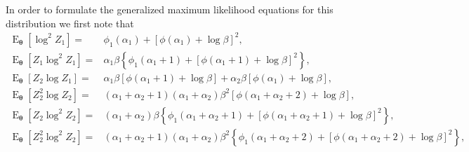 \documentclass[10pt,a4paper,onecolumn]{article} %
\newcommand{\bs}{\boldsymbol}
\newcommand{\on}{\operatorname}
\begin{document}
In order to formulate the generalized maximum likelihood equations for this distribution we first note that
\begin{equation*}
\begin{aligned}
\on{E}_{\bs{\theta}}\left[\log^2 Z_1\right] = & \phi_1(\alpha_1) + \left[\phi(\alpha_1) + \log \beta\right]^2, \\
\on{E}_{\bs{\theta}}\left[Z_1 \log^2 Z_1\right] = & \alpha_1\beta\left\{ \phi_1(\alpha_1 + 1) + \left[\phi(\alpha_1 + 1) + \log \beta\right]^2\right\}, \\
\on{E}_{\bs{\theta}}\left[Z_2 \log Z_1\right] =& \alpha_1\beta \left[\phi(\alpha_1 + 1) + \log \beta\right] + \alpha_2\beta \left[\phi(\alpha_1) + \log \beta\right], \\
\on{E}_{\bs{\theta}}\left[Z_2^2 \log Z_2
\right] = & (\alpha_1 + \alpha_2 + 1)(\alpha_1 + \alpha_2)\beta^2
\left[\phi(\alpha_1 + \alpha_2 + 2) + \log \beta\right], \\
\on{E}_{\bs{\theta}}\left[Z_2 \log^2 Z_2\right] = &(\alpha_1 + \alpha_2)\beta
\left\{\phi_1(\alpha_1 + \alpha_2 + 1) + \left[\phi(\alpha_1 + \alpha_2 + 1) + \log\beta\right]^2
\right\}, \\
\on{E}_{\bs{\theta}}\left[Z_2^2 \log^2
Z_2\right] = & (\alpha_1 + \alpha_2 + 1)(\alpha_1 + \alpha_2)\beta^2
\left\{\phi_1(\alpha_1 + \alpha_2 + 2) + \left[\phi(\alpha_1 + \alpha_2 + 2) + \log\beta\right]^2
\right\},
\end{aligned}
\end{equation*}
\end{document}

